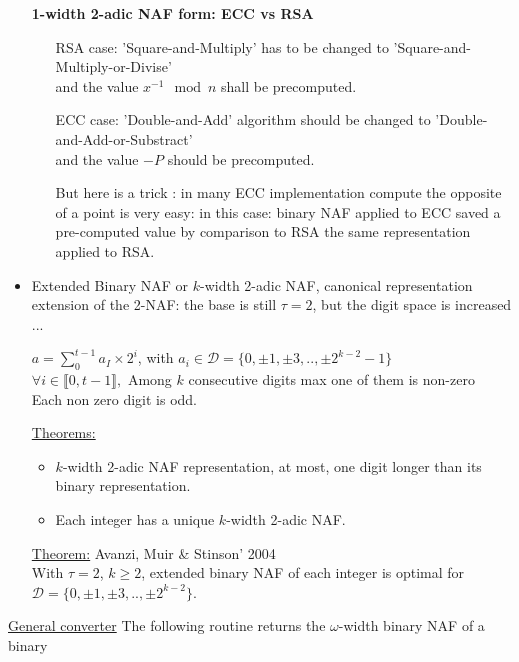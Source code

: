 \begin{itemize}
\textbf{1-width 2-adic NAF form: ECC vs RSA}
\begin{itemize}
\item[RSA case:] 'Square-and-Multiply' has to be changed to 'Square-and-Multiply-or-Divise'\\
and the value $x^{-1} \mod n$ shall be precomputed.\\ 
\item[ECC case:] 'Double-and-Add' algorithm should be changed to 'Double-and-Add-or-Substract' \\
and the value $-P $ should be precomputed.

But here is a trick : in many ECC implementation compute the opposite of a point 
is very easy: in this case: binary NAF applied to ECC saved a pre-computed value 
by comparison to RSA the same representation applied to RSA.
\end{itemize}





\newpage
	\item Extended Binary NAF or $k$-width 2-adic NAF, canonical representation\\
		extension of the 2-NAF: the base is still $\tau=2$,
		but the digit space is increased ...
			\begin{center}
$a =  \sum \limits_0^{t-1} a_I \times 2^i$,
with $a_i \in \mathcal{D} =\{ 0,\pm 1, \pm 3, .., \pm 2^{k-2}-1 \}$ \\
$\forall i \in \llbracket 0,t-1 \rrbracket,$
Among $k$ consecutive digits max one of them is non-zero\\
Each non zero digit is odd.
			\end{center}


		\underline{Theorems:} 
\begin{itemize}
\item $k$-width 2-adic NAF representation, 
at most, one digit longer than its binary representation.
\item Each integer has a unique $k$-width 2-adic NAF.
\end{itemize}

		\underline{Theorem:} Avanzi, Muir \& Stinson' 2004\\
		With $\tau = 2$, $k \geq 2$, extended binary NAF of each integer 
		is optimal for $\mathcal{D} =\{ 0,\pm 1, \pm 3, .., \pm 2^{k-2} \}$.	
	



\end{itemize}						
		\underline{General converter}
			The following routine returns the $\omega$-width binary NAF of a binary 
			
